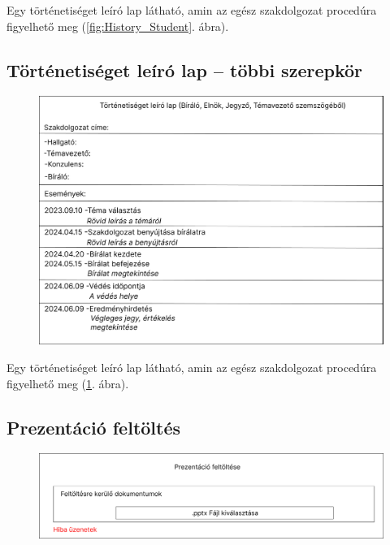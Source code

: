 \documentclass[a4paper,12pt]{article}
\begin{document}
Egy történetiséget leíró lap látható, amin az egész szakdolgozat procedúra figyelhető meg (\ref{fig:History_Student}. ábra).

\subsection{Történetiséget leíró lap -- többi szerepkör}

\begin{figure}
	\centering
	\includegraphics[width=\textwidth]{images/Web_pages/History.jpg}
	\caption{}
	\label{fig:History}
\end{figure}

Egy történetiséget leíró lap látható, amin az egész szakdolgozat procedúra figyelhető meg (\ref{fig:History}. ábra).

\subsection{Prezentáció feltöltés}

\begin{figure}
	\centering
	\includegraphics[width=\textwidth]{images/Web_pages/Presentation_Upload.jpg}
	\caption{}
	\label{fig:Presentation_Upload}
\end{figure}
\end{document}
